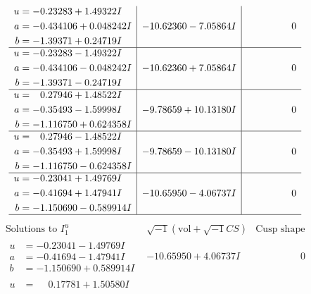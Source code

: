 \documentclass[1p]{elsarticle_modified}
\theoremstyle{definition}
\newcommand{\I}{\sqrt{-1}}
\begin{document}
$$\begin{array}{c|c|c}
\begin{aligned}
u &= -0.23283 + 1.49322 I \\
a &= -0.434106 + 0.048242 I \\
b &= -1.39371 + 0.24719 I\end{aligned}
 & -10.62360 - 7.05864 I & \phantom{-0.000000 } 0 \\ \hline\begin{aligned}
u &= -0.23283 - 1.49322 I \\
a &= -0.434106 - 0.048242 I \\
b &= -1.39371 - 0.24719 I\end{aligned}
 & -10.62360 + 7.05864 I & \phantom{-0.000000 } 0 \\ \hline\begin{aligned}
u &= \phantom{-}0.27946 + 1.48522 I \\
a &= -0.35493 - 1.59998 I \\
b &= -1.116750 + 0.624358 I\end{aligned}
 & -9.78659 + 10.13180 I & \phantom{-0.000000 } 0 \\ \hline\begin{aligned}
u &= \phantom{-}0.27946 - 1.48522 I \\
a &= -0.35493 + 1.59998 I \\
b &= -1.116750 - 0.624358 I\end{aligned}
 & -9.78659 - 10.13180 I & \phantom{-0.000000 } 0 \\ \hline\begin{aligned}
u &= -0.23041 + 1.49769 I \\
a &= -0.41694 + 1.47941 I \\
b &= -1.150690 - 0.589914 I\end{aligned}
 & -10.65950 - 4.06737 I & \phantom{-0.000000 } 0\\
 \hline 
 \end{array}$$\newpage$$\begin{array}{c|c|c}  
\text{Solutions to }I^u_{1}& \I (\text{vol} + \sqrt{-1}CS) & \text{Cusp shape}\\
 \hline 
\begin{aligned}
u &= -0.23041 - 1.49769 I \\
a &= -0.41694 - 1.47941 I \\
b &= -1.150690 + 0.589914 I\end{aligned}
 & -10.65950 + 4.06737 I & \phantom{-0.000000 } 0 \\ \hline\begin{aligned}
u &= \phantom{-}0.17781 + 1.50580 I \\

\end{aligned}
\end{array}$$
\end{document}
